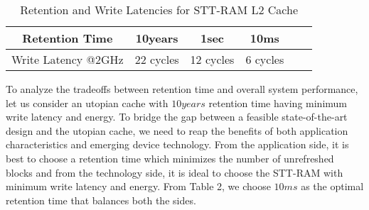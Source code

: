 

\begin{table*}[t]
  \centering
  \caption{Retention and Write Latencies for STT-RAM L2 Cache}
  \label{table:rt-wt}
  \begin{tabular}{| c | c | c | c | c | c |}
    \hline
     Retention Time & 10years & 1sec &10ms \\
    \hline
    Write Latency @2GHz & 22 cycles & 12 cycles & 6 cycles \\
    \hline
  \end{tabular}
\end{table*}

To analyze the tradeoffs between retention time and overall system performance, let us consider an utopian cache
with $10years$ retention time having minimum write latency and energy.  To bridge the gap between a
feasible state-of-the-art design and the utopian cache, we need to reap the benefits of both application
characteristics and emerging device technology. From the application side, it is best to choose a retention time
which minimizes the number of unrefreshed blocks and from the technology side, it is ideal to choose the
STT-RAM with minimum write latency and energy. From Table 2, we choose $10ms$ as the optimal retention time that
balances both the sides.

